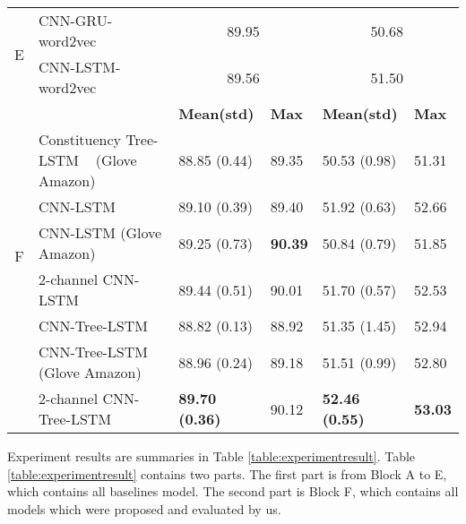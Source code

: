 \begin{table*}[]
\begin{tabular}{|c|l|ll|ll|}
		\hline
		\multirow{2}{*}{E}  & CNN-GRU-word2vec~\cite{cnn-rnn}                    &\multicolumn{2}{c|}{89.95} & \multicolumn{2}{c|}{50.68} \\
		& CNN-LSTM-word2vec~\cite{cnn-rnn}   &       \multicolumn{2}{c|}{89.56} & \multicolumn{2}{c|}{51.50} \Bstrut    \\
		\Xhline{3\arrayrulewidth}
		\Xhline{3\arrayrulewidth}
		    &   & \textbf{Mean(std)} & \textbf{Max} & \textbf{Mean(std)} & \textbf{Max}  \\
		 \cline{3-6}
		\multirow{6}{*}{F} & Constituency Tree-LSTM ~\cite{treeLSTM} (Glove Amazon) & 88.85 (0.44) & 89.35 & 50.53 (0.98) & 51.31 \Tstrut \\
		 & CNN-LSTM                                 & 89.10 (0.39)  & 89.40 & 51.92 (0.63) & 52.66 \\
		  & CNN-LSTM (Glove Amazon) & 89.25 (0.73) & \textbf{90.39}  & 50.84 (0.79) & 51.85 \\
		& 2-channel CNN-LSTM                        & 89.44    (0.51) & 90.01 & 51.70 (0.57) & 52.53 \\
		 & CNN-Tree-LSTM                            & 88.82 (0.13) & 88.92 & 51.35 (1.45) & 52.94 \\
		& CNN-Tree-LSTM (Glove Amazon)             & 88.96 (0.24) & 89.18 & 51.51 (0.99) & 52.80 \\
		& 2-channel CNN-Tree-LSTM  & \textbf{89.70 (0.36)} & 90.12  & \textbf{52.46 (0.55)} & \textbf{53.03} \Bstrut  \\
		\hline
	\end{tabular}
\end{table*}
Experiment results are summaries in Table \ref{table:experimentresult}.
Table \ref{table:experimentresult} contains two parts.
The first part is from Block A to E, which contains all baselines model.
The second part is Block F, which contains all models which were proposed and evaluated by us.
